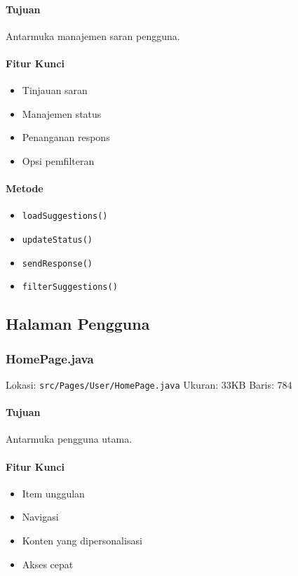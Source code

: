 \documentclass[12pt,a4paper]{article}
\begin{document}
\paragraph{Tujuan}
Antarmuka manajemen saran pengguna.

\paragraph{Fitur Kunci}
\begin{itemize}
    \item Tinjauan saran
    \item Manajemen status
    \item Penanganan respons
    \item Opsi pemfilteran
\end{itemize}

\paragraph{Metode}
\begin{itemize}
    \item \texttt{loadSuggestions()}
    \item \texttt{updateStatus()}
    \item \texttt{sendResponse()}
    \item \texttt{filterSuggestions()}
\end{itemize}

\subsection{Halaman Pengguna}
\subsubsection{HomePage.java}
Lokasi: \texttt{src/Pages/User/HomePage.java}
Ukuran: 33KB
Baris: 784

\paragraph{Tujuan}
Antarmuka pengguna utama.

\paragraph{Fitur Kunci}
\begin{itemize}
    \item Item unggulan
    \item Navigasi
    \item Konten yang dipersonalisasi
    \item Akses cepat
\end{itemize}
\end{document}
